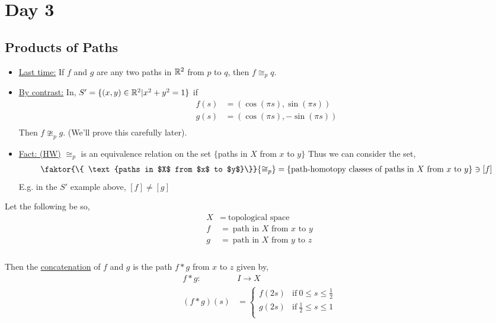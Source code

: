 \documentclass[../notes.tex]{subfiles}
\begin{document}
\section{Day 3}
    \subsection{Products of Paths}
    \begin{itemize}
        \item \underline{Last time:} If $f$ and $g$ are any two paths in $\mathbb{R}^2$ from $p$ to $q$, then $f\cong_{p}q$.
        \item \underline{By contrast:} In, $S'=\{(x,y)\in \mathbb{R}^2| x^2+y^2=1\}$ if
            \begin{align*}
                f(s)&=(\cos(\pi s), \sin(\pi s))\\
                g(s)&=(\cos(\pi s), -\sin(\pi s))\\
            \end{align*}
            Then $f\ncong_{p}g$. (We'll prove this carefully later).
        \item \underline{Fact: (HW)} $\cong_{p}$ is an equivalence relation on the set $\{$paths in $X$ from $x$ to $y\}$
            Thus we can consider the set,
            \begin{align*}
                \faktor{\{ \text{paths in $X$ from $x$ to $y$}\}}{\cong_{p}}
                =\{\text{path-homotopy classes of paths in $X$ from $x$ to $y$}\}\ni [f]\\
            \end{align*}
            E.g. in the $S'$ example above, $[f]\neq[g]$
    \end{itemize}
        \begin{definition} Let the following be so,
            \begin{align*}
                X &=\ \text{topological space}\\
                f &=\ \text{path in $X$ from $x$ to $y$}\\
                g &=\ \text{path in $X$ from $y$ to $z$}\\
            \end{align*}\\
            Then the \underline{concatenation} of $f$ and $g$ is the path $f*g$ from $x$ to $z$ given by,
            \begin{align*}
                f*g:\ &I \rightarrow X\\
                (f*g)(s)&=\begin{cases}
                    f(2s) & \text{if}\ 0\leq s \leq \frac{1}{2}\\
                    g(2s) & \text{if}\ \frac{1}{2}\leq s \leq 1\\
                \end{cases}\\
            \end{align*}
        \end{definition}
\end{document}

